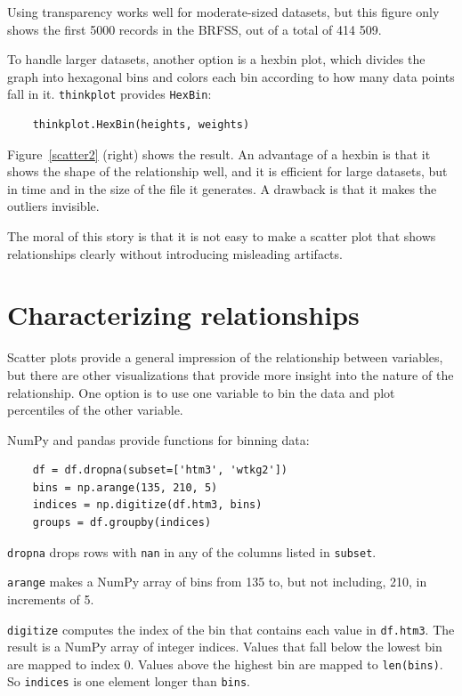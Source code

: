 \documentclass[12pt]{book}
\begin{document}
Using transparency works well for moderate-sized datasets, but this
figure only shows the first 5000 records in the BRFSS, out of a total
of 414 509.

To handle larger datasets, another option is a hexbin plot, which
divides the graph into hexagonal bins and colors each bin according to
how many data points fall in it.  {\tt thinkplot} provides 
{\tt HexBin}:
%
\begin{verbatim}
    thinkplot.HexBin(heights, weights)
\end{verbatim}
%
Figure~\ref{scatter2} (right) shows the result.  An advantage of a
hexbin is that it shows the shape of the relationship well, and it is
efficient for large datasets, but in time and in the size of the file
it generates.  A drawback is that it makes the outliers invisible.

The moral of this story is that it is
not easy to make a scatter plot that shows relationships clearly
without introducing misleading artifacts.


\section{Characterizing relationships}
\label{characterizing}

Scatter plots provide a general impression of the relationship
between variables, but there are other visualizations that provide
more insight into the nature of the relationship.  One option is
to use one variable to bin the data and plot percentiles of the
other variable.

NumPy and pandas provide functions for binning data:

\begin{verbatim}
    df = df.dropna(subset=['htm3', 'wtkg2'])
    bins = np.arange(135, 210, 5)
    indices = np.digitize(df.htm3, bins)
    groups = df.groupby(indices)
\end{verbatim}

{\tt dropna} drops rows with {\tt nan} in any of the columns
listed in {\tt subset}.

{\tt arange} makes a NumPy array of bins from 135 to, but not including,
210, in increments of 5.

{\tt digitize} computes the index of the bin that contains each value
in {\tt df.htm3}.  The result is a NumPy array of integer indices.
Values that fall below the lowest bin are mapped to index 0.  Values
above the highest bin are mapped to {\tt len(bins)}.  So
{\tt indices} is one element longer than {\tt bins}.
\end{document}
